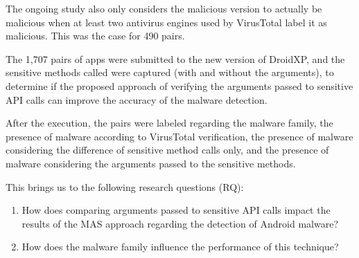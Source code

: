 


The ongoing study also only considers the malicious version to actually be malicious when at least two antivirus engines used by VirusTotal label it as malicious. This was the case for 490 pairs. 

The 1,707 pairs of apps were submitted to the new version of DroidXP, and the sensitive methods called were captured (with and without the arguments), to determine if the proposed approach of verifying the arguments passed to sensitive API calls can improve the accuracy of the malware detection.

After the execution, the pairs were labeled regarding the malware family, the presence of malware according to VirusTotal verification, the presence of malware considering the difference of sensitive method calls only, and the presence of malware considering the arguments passed to the sensitive methods.

This brings us to the following research questions (RQ):

\begin{enumerate}
    \item How does comparing arguments passed to sensitive API calls impact the results of the MAS approach regarding the detection of Android malware?
    \item How does the malware family influence the performance of this technique?
\end{enumerate}

